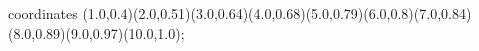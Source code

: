 					coordinates { (1.0,0.4)(2.0,0.51)(3.0,0.64)(4.0,0.68)(5.0,0.79)(6.0,0.8)(7.0,0.84)(8.0,0.89)(9.0,0.97)(10.0,1.0)};